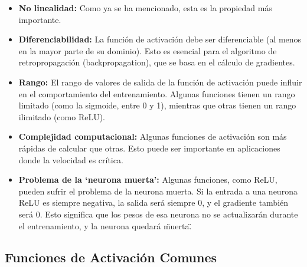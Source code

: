 \documentclass{article}
\begin{document}
\begin{itemize}
    \item \textbf{No linealidad:} Como ya se ha mencionado, esta es la propiedad más importante.
    \item \textbf{Diferenciabilidad:} La función de activación debe ser diferenciable (al menos en la mayor parte de su dominio).  Esto es esencial para el algoritmo de retropropagación (backpropagation), que se basa en el cálculo de gradientes.
    \item \textbf{Rango:} El rango de valores de salida de la función de activación puede influir en el comportamiento del entrenamiento. Algunas funciones tienen un rango limitado (como la sigmoide, entre 0 y 1), mientras que otras tienen un rango ilimitado (como ReLU).
    \item \textbf{Complejidad computacional:} Algunas funciones de activación son más rápidas de calcular que otras.  Esto puede ser importante en aplicaciones donde la velocidad es crítica.
    \item \textbf{Problema de la `neurona muerta':} Algunas funciones, como ReLU, pueden sufrir el problema de la neurona muerta. Si la entrada a una neurona ReLU es siempre negativa, la salida será siempre 0, y el gradiente también será 0.  Esto significa que los pesos de esa neurona no se actualizarán durante el entrenamiento, y la neurona quedará \"muerta\".
\end{itemize}

\subsection{Funciones de Activación Comunes}
\end{document}
